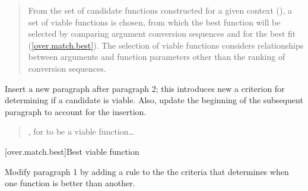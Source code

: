 \begin{quote}
\pnum
From the set of candidate functions constructed for a given context 
(), a set of viable functions is chosen, from which 
the best function will be selected by comparing argument conversion 
sequences and  for the best fit 
(\ref{over.match.best}).
%
The selection of viable functions considers  relationships between arguments and function 
parameters other than the ranking of conversion sequences.
\end{quote}

Insert a new paragraph after paragraph 2; this introduces new a criterion for 
determining if a candidate is viable. Also, update the beginning of the 
subsequent paragraph to account for the insertion.

\begin{quote}
\setcounter{Paras}{2}
\pnum
{}

\pnum
{}, for  to be a viable function\ldots
\end{quote}

[over.match.best]{Best viable function}

Modify paragraph 1 by adding a rule to the the criteria that determines when 
one function is better than another. 

